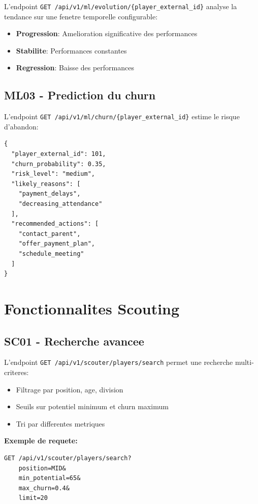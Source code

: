 L'endpoint \texttt{GET /api/v1/ml/evolution/\{player\_external\_id\}} analyse la tendance sur une fenetre temporelle configurable:

\begin{itemize}[leftmargin=*]
  \item \textbf{Progression}: Amelioration significative des performances
  \item \textbf{Stabilite}: Performances constantes
  \item \textbf{Regression}: Baisse des performances
\end{itemize}

\subsection*{ML03 - Prediction du churn}

L'endpoint \texttt{GET /api/v1/ml/churn/\{player\_external\_id\}} estime le risque d'abandon:

\begin{lstlisting}[style=codeblock]
{
  "player_external_id": 101,
  "churn_probability": 0.35,
  "risk_level": "medium",
  "likely_reasons": [
    "payment_delays",
    "decreasing_attendance"
  ],
  "recommended_actions": [
    "contact_parent",
    "offer_payment_plan",
    "schedule_meeting"
  ]
}
\end{lstlisting}

\section{Fonctionnalites Scouting}

\subsection*{SC01 - Recherche avancee}

L'endpoint \texttt{GET /api/v1/scouter/players/search} permet une recherche multi-criteres:

\begin{itemize}[leftmargin=*]
  \item Filtrage par position, age, division
  \item Seuils sur potentiel minimum et churn maximum
  \item Tri par differentes metriques
\end{itemize}

\textbf{Exemple de requete:}
\begin{lstlisting}[style=codeblock]
GET /api/v1/scouter/players/search?
    position=MID&
    min_potential=65&
    max_churn=0.4&
    limit=20
\end{lstlisting}

